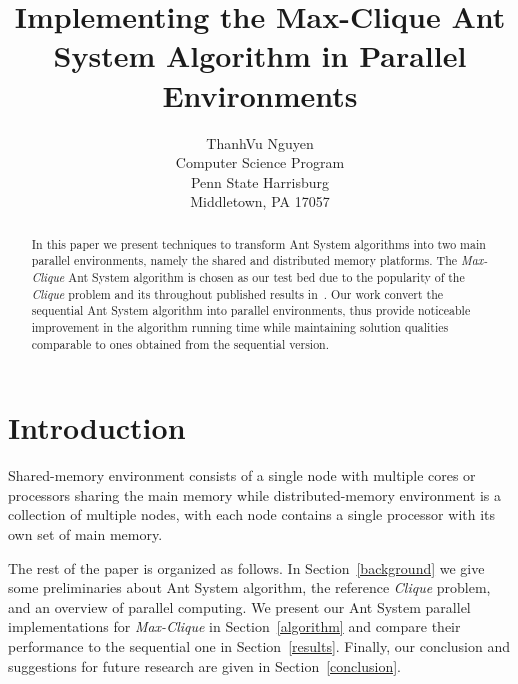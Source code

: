 \documentclass[11pt]{article}
\begin{document}
  

\title{Implementing the Max-Clique Ant System Algorithm in Parallel Environments} 
\author{ 
ThanhVu Nguyen\\ 
Computer Science Program\\ 
Penn State Harrisburg\\ 
Middletown, PA 17057\\ 
}  
\maketitle  


\begin{abstract}
In this paper we present techniques to transform Ant System algorithms into two main parallel environments, namely the shared and distributed memory platforms. The \textit{Max-Clique} Ant System algorithm is chosen as our test bed due to the popularity of the \textit{Clique} problem and its throughout published results in~\cite{BR}. Our work convert the sequential Ant System algorithm into parallel environments, thus provide noticeable improvement in the algorithm running time while maintaining solution qualities comparable to ones obtained from the sequential version.
\end{abstract}


\section{Introduction}\label{intro}

Shared-memory environment consists of a single node with multiple cores or processors sharing 
the main memory 
while distributed-memory environment is a collection of multiple nodes, with each node 
contains a single processor with its own set of main memory. %

The rest of the paper is organized as follows. In Section~\ref{background} we give some preliminaries about Ant System algorithm, the reference \textit{Clique} problem, and an overview of parallel computing.  We present our Ant System parallel implementations for \textit{Max-Clique} in Section~\ref{algorithm} and compare their performance to the sequential one in Section~\ref{results}.  Finally, our conclusion and suggestions for future research are given in Section~\ref{conclusion}.
\end{document}
